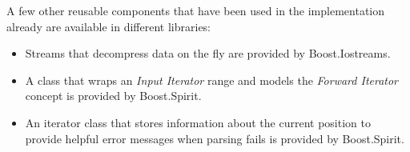 \documentclass[a4paper, parskip=half, twocolumn]{scrartcl}
\begin{document}
A few other reusable components that have been used in the implementation
already are available in different libraries:

\begin{itemize}
  \item Streams that decompress data on the fly are provided by Boost.Iostreams.
  \item A class that wraps an \emph{Input Iterator} range and models the
  \emph{Forward Iterator} concept is provided by Boost.Spirit.
  \item An iterator class that stores information about the current position to
  provide helpful error messages when parsing fails is provided by Boost.Spirit.
\end{itemize}



\end{document}
